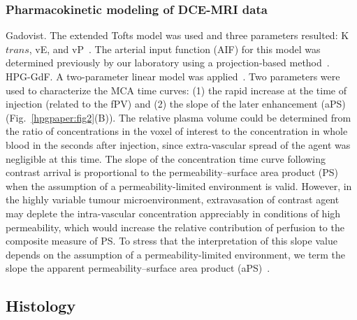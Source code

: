 \subsubsection{Pharmacokinetic modeling of DCE-MRI data}

Gadovist.
The extended Tofts model was used and three parameters resulted: K${trans}$, vE, and vP~\cite{Sourbron:2011ce}.
The arterial input function (AIF) for this model was determined previously by our laboratory using a projection-based method~\cite{Moroz:2013ee}.
HPG-GdF.
A two-parameter linear model was applied~\cite{Pathak:2005gu}.
Two parameters were used to characterize the MCA time curves: (1) the rapid increase at the time of injection (related to the fPV) and (2) the slope of the later enhancement (aPS) (Fig.~\ref{hpgpaper:fig2}(B)).
The relative plasma volume could be determined from the ratio of concentrations in the voxel of interest to the concentration in whole blood in the seconds after injection, since extra-vascular spread of the agent was negligible at this time.
The slope of the concentration time curve following contrast arrival is proportional to the permeability–surface area product (PS) when the assumption of a permeability-limited environment is valid.
However, in the highly variable tumour microenvironment, extravasation of contrast agent may deplete the intra-vascular concentration appreciably in conditions of high permeability, which would increase the relative contribution of perfusion to the composite measure of PS.
To stress that the interpretation of this slope value depends on the assumption of a permeability-limited environment, we term the slope the apparent permeability–surface area product (aPS)~\cite{DaldrupLink:2004gy,Dafni:2002kb}.

\subsection{Histology}

